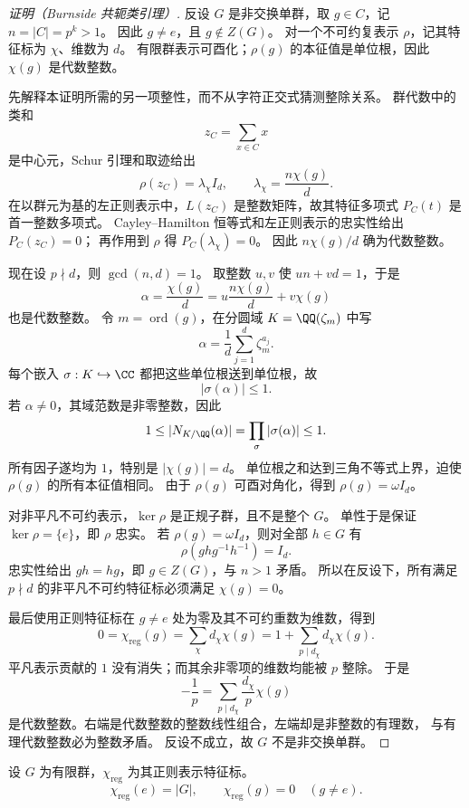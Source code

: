 \begin{proof}[证明（Burnside 共轭类引理）]
反设 $G$ 是非交换单群，取 $g\in C$，记 $n=|C|=p^k>1$。
因此 $g\ne e$，且 $g\notin Z(G)$。
对一个不可约复表示 $\rho$，记其特征标为 $\chi$、维数为 $d$。
有限群表示可酉化；$\rho(g)$ 的本征值是单位根，因此 $\chi(g)$ 是代数整数。

先解释本证明所需的另一项整性，而不从字符正交式猜测整除关系。
群代数中的类和
\[
z_C=\sum_{x\in C}x
\]
是中心元，Schur 引理和取迹给出
\[
\rho(z_C)=\lambda_\chi I_d,\qquad
\lambda_\chi=\frac{n\chi(g)}d.
\]
在以群元为基的左正则表示中，$L(z_C)$ 是整数矩阵，故其特征多项式
$P_C(t)$ 是首一整数多项式。
Cayley--Hamilton 恒等式和左正则表示的忠实性给出 $P_C(z_C)=0$；
再作用到 $\rho$ 得 $P_C(\lambda_\chi)=0$。
因此 $n\chi(g)/d$ 确为代数整数。

现在设 $p\nmid d$，则 $\gcd(n,d)=1$。
取整数 $u,v$ 使 $un+vd=1$，于是
\[
\alpha=\frac{\chi(g)}d
=u\frac{n\chi(g)}d+v\chi(g)
\]
也是代数整数。
令 $m=\operatorname{ord}(g)$，在分圆域 $K=\QQ(\zeta_m)$ 中写
\[
\alpha=\frac1d\sum_{j=1}^d\zeta_m^{a_j}.
\]
每个嵌入 $\sigma:K\hookrightarrow\CC$ 都把这些单位根送到单位根，故
\[
|\sigma(\alpha)|\le1.
\]
若 $\alpha\ne0$，其域范数是非零整数，因此
\[
1\le|N_{K/\QQ}(\alpha)|
=\prod_\sigma|\sigma(\alpha)|\le1.
\]
所有因子遂均为 $1$，特别是 $|\chi(g)|=d$。
单位根之和达到三角不等式上界，迫使 $\rho(g)$ 的所有本征值相同。
由于 $\rho(g)$ 可酉对角化，得到 $\rho(g)=\omega I_d$。

对非平凡不可约表示，$\ker\rho$ 是正规子群，且不是整个 $G$。
单性于是保证 $\ker\rho=\{e\}$，即 $\rho$ 忠实。
若 $\rho(g)=\omega I_d$，则对全部 $h\in G$ 有
\[
\rho(ghg^{-1}h^{-1})=I_d.
\]
忠实性给出 $gh=hg$，即 $g\in Z(G)$，与 $n>1$ 矛盾。
所以在反设下，所有满足 $p\nmid d$ 的非平凡不可约特征标必须满足 $\chi(g)=0$。

最后使用正则特征标在 $g\ne e$ 处为零及其不可约重数为维数，得到
\[
0=\chi_{\mathrm{reg}}(g)=\sum_\chi d_\chi\chi(g)
=1+\sum_{p\mid d_\chi}d_\chi\chi(g).
\]
平凡表示贡献的 $1$ 没有消失；而其余非零项的维数均能被 $p$ 整除。
于是
\[
-\frac1p=\sum_{p\mid d_\chi}\frac{d_\chi}{p}\chi(g)
\]
是代数整数。右端是代数整数的整数线性组合，左端却是非整数的有理数，
与有理代数整数必为整数矛盾。
反设不成立，故 $G$ 不是非交换单群。
\end{proof}

\begin{proposition}
设 $G$ 为有限群，$\chi_{\mathrm{reg}}$ 为其正则表示特征标。
\[
\chi_{\mathrm{reg}}(e)=|G|,
\qquad
\chi_{\mathrm{reg}}(g)=0\quad (g\neq e).
\]
\end{proposition}

